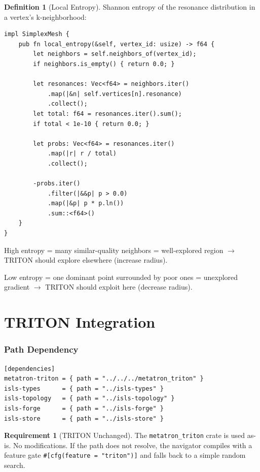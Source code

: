 \documentclass[11pt,a4paper,twoside]{article}
\theoremstyle{definition}
\newtheorem{definition}{Definition}[section]
\newtheorem{requirement}{Requirement}[section]
\theoremstyle{plain}
\theoremstyle{remark}
\begin{document}
\begin{definition}[Local Entropy]\label{def:entropy}
Shannon entropy of the resonance distribution in a vertex's
k-neighborhood:
\begin{lstlisting}
impl SimplexMesh {
    pub fn local_entropy(&self, vertex_id: usize) -> f64 {
        let neighbors = self.neighbors_of(vertex_id);
        if neighbors.is_empty() { return 0.0; }

        let resonances: Vec<f64> = neighbors.iter()
            .map(|&n| self.vertices[n].resonance)
            .collect();
        let total: f64 = resonances.iter().sum();
        if total < 1e-10 { return 0.0; }

        let probs: Vec<f64> = resonances.iter()
            .map(|r| r / total)
            .collect();

        -probs.iter()
            .filter(|&&p| p > 0.0)
            .map(|&p| p * p.ln())
            .sum::<f64>()
    }
}
\end{lstlisting}

High entropy = many similar-quality neighbors = well-explored region
$\to$ TRITON should explore elsewhere (increase radius).

Low entropy = one dominant point surrounded by poor ones = unexplored
gradient $\to$ TRITON should exploit here (decrease radius).
\end{definition}


\part{TRITON Integration}\label{part:triton}

\section{Path Dependency}\label{sec:tritonpath}

\begin{lstlisting}[title={Cargo.toml}]
[dependencies]
metatron-triton = { path = "../../../metatron_triton" }
isls-types      = { path = "../isls-types" }
isls-topology   = { path = "../isls-topology" }
isls-forge      = { path = "../isls-forge" }
isls-store      = { path = "../isls-store" }
\end{lstlisting}

\begin{requirement}[TRITON Unchanged]\label{req:tritonunchanged}
The \texttt{metatron\_triton} crate is used as-is. No modifications.
If the path does not resolve, the navigator compiles with a feature
gate \texttt{\#[cfg(feature = "triton")]} and falls back to a
simple random search.
\end{requirement}
\end{document}
